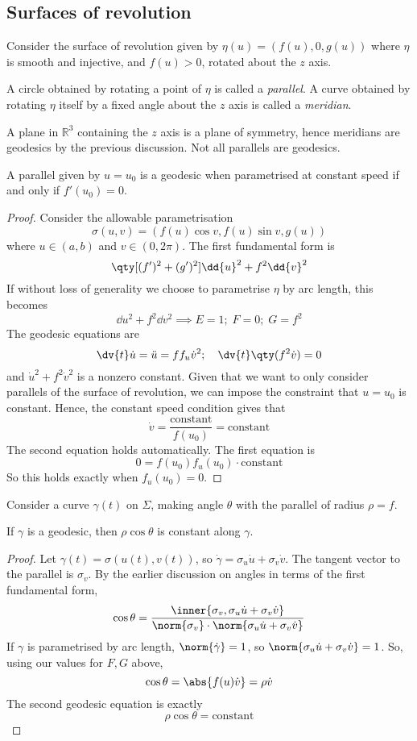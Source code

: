\subsection{Surfaces of revolution}
Consider the surface of revolution given by \( \eta(u) = (f(u), 0, g(u)) \) where \( \eta \) is smooth and injective, and \( f(u) > 0 \), rotated about the \( z \) axis.
\begin{definition}
	A circle obtained by rotating a point of \( \eta \) is called a \textit{parallel}.
	A curve obtained by rotating \( \eta \) itself by a fixed angle about the \( z \) axis is called a \textit{meridian}.
\end{definition}
A plane in \( \mathbb R^3 \) containing the \( z \) axis is a plane of symmetry, hence meridians are geodesics by the previous discussion.
Not all parallels are geodesics.
\begin{lemma}
	A parallel given by \( u = u_0 \) is a geodesic when parametrised at constant speed if and only if \( f'(u_0) = 0 \).
\end{lemma}
\begin{proof}
	Consider the allowable parametrisation
	\[
		\sigma(u,v) = (f(u) \cos v, f(u) \sin v, g(u))
	\]
	where \( u \in (a,b) \) and \( v \in (0,2\pi) \).
	The first fundamental form is
	\[
		\qty[ (f')^2 + (g')^2 ] \dd{u}^2 + f^2 \dd{v}^2
	\]
	If without loss of generality we choose to parametrise \( \eta \) by arc length, this becomes
	\[
		\dd{u}^2 + f^2 \dd{v}^2 \implies E = 1;\;F = 0;\;G = f^2
	\]
	The geodesic equations are
	\[
		\dv{t} \dot u = \ddot u = f f_u \dot v^2;\quad \dv{t} \qty(f^2 \dot v) = 0
	\]
	and \( \dot u^2 + f^2 \dot v^2 \) is a nonzero constant.
	Given that we want to only consider parallels of the surface of revolution, we can impose the constraint that \( u = u_0 \) is constant.
	Hence, the constant speed condition gives that
	\[
		\dot v = \frac{\text{constant}}{f(u_0)} = \text{constant}
	\]
	The second equation holds automatically.
	The first equation is
	\[
		0 = f(u_0) f_u(u_0) \cdot \text{constant}
	\]
	So this holds exactly when \( f_u(u_0) = 0 \).
\end{proof}
Consider a curve \( \gamma(t) \) on \( \Sigma \), making angle \( \theta \) with the parallel of radius \( \rho = f \).
\begin{proposition}
	If \( \gamma \) is a geodesic, then \( \rho \cos \theta \) is constant along \( \gamma \).
\end{proposition}
\begin{proof}
	Let \( \gamma(t) = \sigma(u(t),v(t)) \), so \( \dot\gamma = \sigma_u \dot u + \sigma_v \dot v \).
	The tangent vector to the parallel is \( \sigma_v \).
	By the earlier discussion on angles in terms of the first fundamental form,
	\[
		\cos \theta = \frac{\inner{\sigma_v, \sigma_u \dot u + \sigma_v \dot v}}{\norm{\sigma_v} \cdot \norm{\sigma_u \dot u + \sigma_v \dot v}}
	\]
	If \( \gamma \) is parametrised by arc length, \( \norm{\dot \gamma} = 1 \), so \( \norm{\sigma_u \dot u + \sigma_v \dot v} = 1 \).
	So, using our values for \( F, G \) above,
	\[
		\cos \theta = \abs{f(u) \dot v} = \rho \dot v
	\]
	The second geodesic equation is exactly
	\[
		\rho \cos \theta = \text{constant}
	\]
\end{proof}
